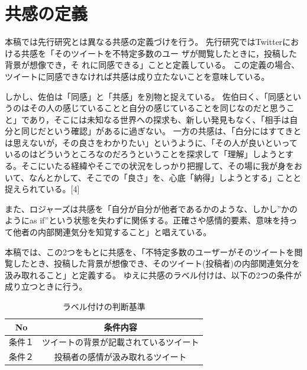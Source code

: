 \documentclass[dvipdfmx]{issj}
\begin{document}
\newpage

\section{共感の定義}  %
本稿では先行研究とは異なる共感の定義づけを行う。
先行研究ではTwitterにおける共感を「そのツイートを不特定多数のユー ザが閲覧したときに，投稿した背景が想像でき，そ れに同感できる」ことと定義している。
この定義の場合、ツイートに同感できなければ共感は成り立たないことを意味している。


しかし、佐伯は「同感」と「共感」を別物と捉えている。
佐伯曰く、「同感というのはその人の感じていることと自分の感じていることを同じなのだと思うこと」であり，そこには未知なる世界への探求も、新しい発見もなく、「相手は自分と同じだという確認」があるに過ぎない。
一方の共感は、「白分にはすてきとは思えないが，その良さをわかりたい」というように、「その人が良いといっているのはどういうところなのだろうということを探求して「理解」しようとする。そこにいたる経緯やそこでの状況をしっかり把握して、その場に我が身をおいて、なんとかして、そこでの「良さ」を、心底「納得」しようとする」ことと捉えられている。[4]


また、ロジャーズは共感を「自分が自分が他者であるかのような、しかし”かのようにas if”という状態を失わずに関係する。正確さや感情的要素、意味を持って他者の内部関連気分を知覚すること」と唱えている。


本稿では、この2つをもとに共感を、「不特定多数のユーザーがそのツイートを閲覧したとき、投稿した背景が想像でき、そのツイート(投稿者)の内部関連気分を汲み取れること」と定義する。
ゆえに共感のラベル付けは、以下の2つの条件が成り立つときに行う。

\begin{table}[h]\centering
\caption{ラベル付けの判断基準}\label{tbl:font}
\begin{small}
\begin{tabular}{|c|c|} \hline
No   & 条件内容\\\hline\hline
条件１& ツイートの背景が記載されているツイート\\\hline
条件２ & 投稿者の感情が汲み取れるツイート\\\hline
\end{tabular}
\end{small}
\end{table}


\end{document}
